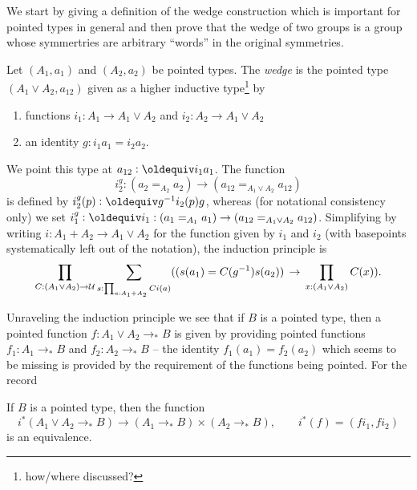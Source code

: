 
We start by giving a definition of the wedge construction which is important for pointed types in general and then prove that the wedge of two groups is a group whose symmertries are arbitrary ``words'' in the original symmetries.

\begin{definition}
  \label{def:wedge}
  Let $(A_1,a_1)$ and $(A_2,a_2)$ be pointed types.  The \emph{wedge} is the pointed type $(A_1\vee A_2,a_{12})$ given as a higher inductive type\footnote{how/where discussed?} by
  \begin{enumerate}
  \item functions $i_1:A_1\to A_1\vee A_2$ and $i_2:A_2\to A_1\vee A_2$
  \item an identity $g:i_1a_1=i_2a_2$.
  \end{enumerate}
We point this type at $a_{12}\defequi i_1a_1$.
  The function 
$$i^g_2:(a_2=_{A_2}a_2)\to(a_{12}=_{A_1\vee A_2}a_{12})$$ 
is defined by $i^g_2(p)\defequi g^{-1}i_2(p)g$, whereas (for notational consistency only) we set $i_1^g\defequi i_1:(a_1=_{A_1}a_1)\to(a_{12}=_{A_1\vee A_2}a_{12})$.
Simplifying by writing $i:A_1+A_2\to A_1\vee A_2$ for the function given by $i_1$ and $i_2$ (with basepoints systematically left out of the notation), 
the induction principle is
$$\prod_{C:(A_1\vee A_2)\to\UU}\sum_{s:\prod_{a:A_1+A_2}Ci(a)}%
((s(a_1)=C(g^{-1})s(a_2))\,\to\,\prod_{x:(A_1\vee A_2)}C(x)).$$
\end{definition}


Unraveling the induction principle we see that if $B$ is a pointed type, then a  pointed function $f:A_1\vee A_2\to_* B$ is given by providing pointed functions $f_1:A_1\to_* B$ and $f_2:A_2\to_* B$  -- the identity $f_1(a_1)=f_2(a_2)$ which seems to be missing is provided by the requirement of the functions being pointed.  For the record
\begin{lemma}
  \label{lem:univvee}
  If $B$ is a pointed type, then the function 
  $$i^*(A_1\vee A_2\to_*B)\to(A_1\to_*B)\times(A_2\to_*B),\qquad i^*(f)=(fi_1,fi_2)
$$
is an equivalence.
\end{lemma}

